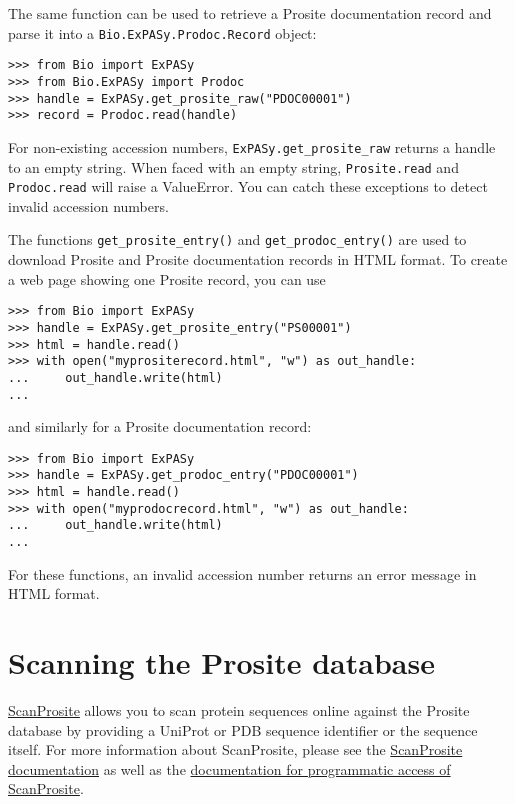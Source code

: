 The same function can be used to retrieve a Prosite documentation record and parse it into a \verb|Bio.ExPASy.Prodoc.Record| object:

\begin{verbatim}
>>> from Bio import ExPASy
>>> from Bio.ExPASy import Prodoc
>>> handle = ExPASy.get_prosite_raw("PDOC00001")
>>> record = Prodoc.read(handle)
\end{verbatim}

For non-existing accession numbers, \verb|ExPASy.get_prosite_raw| returns a handle to an empty string. When faced with an empty string, \verb|Prosite.read| and \verb|Prodoc.read| will raise a ValueError. You can catch these exceptions to detect invalid accession numbers.

The functions \verb|get_prosite_entry()| and \verb|get_prodoc_entry()| are used to download Prosite and Prosite documentation records in HTML format. To create a web page showing one Prosite record, you can use

\begin{verbatim}
>>> from Bio import ExPASy
>>> handle = ExPASy.get_prosite_entry("PS00001")
>>> html = handle.read()
>>> with open("myprositerecord.html", "w") as out_handle:
...     out_handle.write(html)
...
\end{verbatim}

and similarly for a Prosite documentation record:

\begin{verbatim}
>>> from Bio import ExPASy
>>> handle = ExPASy.get_prodoc_entry("PDOC00001")
>>> html = handle.read()
>>> with open("myprodocrecord.html", "w") as out_handle:
...     out_handle.write(html)
...
\end{verbatim}

For these functions, an invalid accession number returns an error message in HTML format.

\section{Scanning the Prosite database}

\href{https://prosite.expasy.org/prosite.html}{ScanProsite} allows you to scan protein sequences online against the Prosite database by providing a UniProt or PDB sequence identifier or the sequence itself. For more information about ScanProsite, please see the \href{https://prosite.expasy.org/prosite_doc.html}{ScanProsite documentation} as well as the \href{https://prosite.expasy.org/scanprosite/scanprosite_doc.html#rest}{documentation for programmatic access of ScanProsite}.

